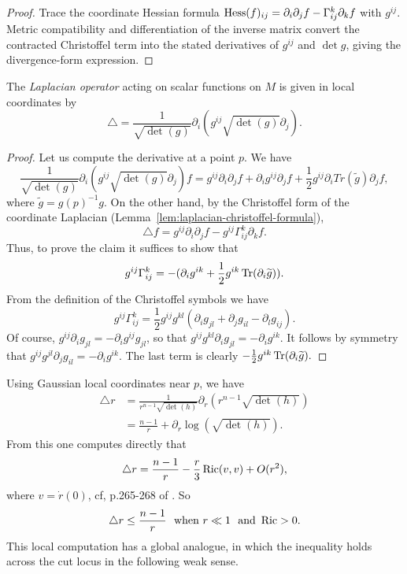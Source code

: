 \begin{proof}
\sketch
{}

Trace the coordinate Hessian formula $\operatorname{Hess}(f)_{ij}=\partial_i\partial_jf-\Gamma^k_{ij}\partial_kf$ with $g^{ij}$. Metric compatibility and differentiation of the inverse matrix convert the contracted Christoffel term into the stated derivatives of $g^{ij}$ and $\det g$, giving the divergence-form expression.
\end{proof}

\begin{lemma}
\label{lem:laplacian-local-formula}





The \textit{Laplacian operator} acting on scalar
functions on $M$ is given in local coordinates by
\[ \triangle  = \frac{1}{\sqrt{\det(g)}}\partial_i
\left(g^{ij}\sqrt{\det(g)}\partial_j\right). \]
\end{lemma}

\begin{proof}
\sketch
{}

Let us compute the derivative at a point $p$. We have
$$\frac{1}{\sqrt{\det(g)}}\partial_i
\left(g^{ij}\sqrt{\det(g)}\partial_j\right)f=g^{ij}\partial_i\partial_jf+\partial_ig^{ij}\partial_jf+
\frac{1}{2}g^{ij}\partial_iTr(\tilde g)\partial_jf,$$ where $\tilde
g=g(p)^{-1}g$. On the other hand, by the Christoffel form of the
coordinate Laplacian (Lemma~\ref{lem:laplacian-christoffel-formula}),
$$\triangle
f=g^{ij}\partial_i\partial_jf-g^{ij}\Gamma_{ij}^k\partial_kf.$$ Thus,
to prove the claim it suffices to show that
$$g^{ij}\Gamma_{ij}^k=-(\partial_ig^{ik}+\frac{1}{2}g^{ik}\operatorname{Tr}(\partial_i\widetilde g)).$$
From the definition of the Christoffel symbols we have
$$g^{ij}\Gamma_{ij}^k=\frac{1}{2}g^{ij}g^{kl}(\partial_ig_{jl}+\partial_jg_{il}-\partial_lg_{ij}).$$
Of course, $g^{ij}\partial_ig_{jl}=-\partial_ig^{ij}g_{jl}$, so that
 $g^{ij}g^{kl}\partial_ig_{jl}=-\partial_ig^{ik}$. It follows by symmetry that $g^{ij}g^{jl}\partial_jg_{il}
 =-\partial_ig^{ik}$. The last term is clearly $-\frac{1}{2}g^{ik}\operatorname{Tr}(\partial_i\widetilde g).$
\end{proof}

Using Gaussian local coordinates near $p$, we have
\begin{align*}
\triangle r &=
\frac{1}{r^{n-1}\sqrt{\det(h)}}\partial_r\left(r^{n-1}\sqrt{\det(h)}\right)\\
&= \frac{n-1}{r}
 + \partial_r\log\left(\sqrt{\det(h)}\right).
\end{align*}
From this one computes directly that
 \[ \triangle r
 = \frac{n-1}{r} - \frac{r}{3}\operatorname{Ric}(v,v)+ O(r^{2}), \]
 where $v = \dot r(0)$, cf,  p.265-268 of \cite{Petersen}. So
 $$\triangle r \leq
 \frac{n-1}{r}\ \ \text{when } r \ll 1\ \ \text{and } \operatorname{Ric} > 0.$$
This local computation has a global analogue, in which the
inequality holds across the cut locus in the following weak sense.

